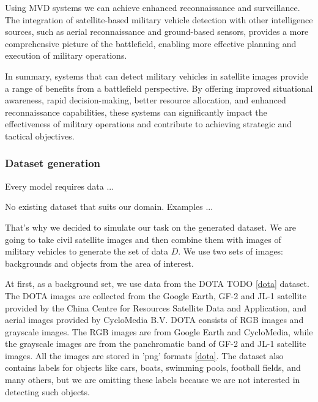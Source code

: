 \documentclass[14pt,a4paper]{extarticle}
\newcounter{e}
\newcounter{pic}
\numberwithin{equation}{section}
\numberwithin{figure}{section}
\begin{document}
Using MVD systems we can achieve enhanced reconnaissance and surveillance. The integration of satellite-based military vehicle detection with other intelligence sources, such as aerial reconnaissance and ground-based sensors, provides a more comprehensive picture of the battlefield, enabling more effective planning and execution of military operations.

In summary, systems that can detect military vehicles in satellite images provide a range of benefits from a battlefield perspective. By offering improved situational awareness, rapid decision-making, better resource allocation, and enhanced reconnaissance capabilities, these systems can significantly impact the effectiveness of military operations and contribute to achieving strategic and tactical objectives.







\subsubsection{Dataset generation}

Every model requires data ...

No existing dataset that suits our domain.
Examples ...

That's why we decided to simulate our task on the generated dataset. We are going to take civil satellite images and then combine them with images of military vehicles to generate the set of data $D$. We use two sets of images: backgrounds and objects from the area of interest.

At first, as a background set, we use data from the DOTA TODO \ref{dota} dataset. The DOTA images are collected from the Google Earth, GF-2 and JL-1 satellite provided by the China Centre for Resources Satellite Data and Application, and aerial images provided by CycloMedia B.V. DOTA consists of RGB images and grayscale images. The RGB images are from Google Earth and CycloMedia, while the grayscale images are from the panchromatic band of GF-2 and JL-1 satellite images. All the images are stored in 'png' formats \ref{dota}. The dataset also contains labels for objects like cars, boats, swimming pools, football fields, and many others, but we are omitting these labels because we are not interested in detecting such objects.
\end{document}
